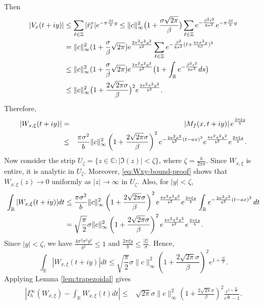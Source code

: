 \documentclass[11pt, reqno]{amsart}
\newcommand{\Z}{\mathbb{Z}}
\newcommand{\R}{\mathbb{R}}
\newcommand{\C}{\mathbb{C}}
\numberwithin{equation}{section}
\begin{document}
\begin{appendices}
Then 
\begin{align}\label{eq:Vx-bound-proof}
|V_x(t+iy)| &\le
\sum_{\ell\in\Z}|\breve r_\ell^x|e^{-\pi\frac{\beta\ell}{b}y} \le \|c\|_\infty^2\big(1+\frac{\sigma\sqrt{2\pi}}{\beta}\big)\sum_{\ell\in\Z}e^{-\frac{\beta^2\ell^2}{8\sigma^2}}
e^{-\pi\frac{\beta\ell}{b}y}\notag\\
	{}& = \|c\|_{\infty}^2 (1 + \frac{\sigma}{\beta} \sqrt{2 \pi}) e^{\frac{2 \pi^2 \sigma^2 y^2}{b^2}} \sum_{\ell \in \Z} e^{- \frac{\beta^2}{8 \sigma^2} (\ell + \frac{4 \pi \sigma^2 y}{b \beta})^2} \notag\\ %
		{}& \le \|c\|_{\infty}^2 (1 + \frac{\sigma}{\beta} \sqrt{2 \pi}) e^{\frac{2 \pi^2 \sigma^2 y^2}{b^2}} \big(1 + \int_{\R} e^{- \frac{\beta^2 s^2}{8 \sigma^2}} ds\big) \notag\\ 
		{}&\le \|c\|_{\infty}^2 \big(1 + \frac{2 \sqrt{2 \pi}\sigma}{\beta} \big)^2 e^{\frac{2 \pi^2 \sigma^2 y^2}{b^2}}.
\end{align}
Therefore,
\begin{eqnarray}\label{eq:Wxy-bound-proof}
|W_{x,\xi}(t+iy)| &=& |M_f(x,t+iy)|\,e^{\frac{2\pi \xi y}{b}}  \notag\\
&\le&
\frac{\pi\sigma^2}{b}\|c\|_\infty^2\left(1+\frac{2\sqrt{2\pi}\sigma}{\beta}\right)^2
e^{-\frac{2\pi^2\sigma^2}{b^2}(t-ax)^2}e^{\frac{4\pi^2\sigma^2 y^2}{b^2}}e^{\frac{2\pi\xi y}{b}}.
\end{eqnarray}
Now consider the strip $U_{\zeta} = \{z \in \C : |\Im(z)| < \zeta\}$, where $\zeta=\frac{b}{2\pi\sigma}$. 
Since \(W_{x,\xi}\) is entire, it is analytic in $U_\zeta$. Moreover, 
\eqref{eq:Wxy-bound-proof} shows that $W_{x,\xi}(z)\to 0$ uniformly as
$|z|\to\infty$ in $U_\zeta$. Also, for $|y|<\zeta$, 
\begin{align}\label{eq:Wxy-integ-bound-proof}
\int_{\R}|W_{x,\xi}(t+iy)|dt &\le \frac{\pi\sigma^2}{b} \|c\|_\infty^2\left(1+\frac{2\sqrt{2\pi}\sigma}{\beta}\right)^2 e^{\frac{4\pi^2\sigma^2 y^2}{b^2}} e^{\frac{2\pi\xi y}{b}}
\int_{\R}e^{-\frac{2\pi^2\sigma^2}{b^2}(t-ax)^2}\,dt \notag\\
&= \sqrt{\frac{\pi}{2}} \sigma \|c\|_\infty^2 \left(1+\frac{2\sqrt{2\pi}\sigma}{\beta}\right)^2
e^{\frac{4\pi^2\sigma^2 y^2}{b^2}}e^{\frac{2\pi\xi y}{b}}.
\end{align}
Since $|y|<\zeta$, we have
$ \frac{4\pi^2\sigma^2 y^2}{b^2}\le 1$ and  $\frac{2\pi\xi y}{b}\le \frac{|\xi|}{\sigma}$.
Hence, 
$$\int_{\R}|W_{x,\xi}(t+iy)|dt \le \sqrt{\frac{\pi}{2}} \sigma \|c\|_\infty^2 \left(1+\frac{2\sqrt{2\pi}\sigma}{\beta}\right)^2 e^{1+\frac{|\xi|}{\sigma}}.$$
Applying Lemma \ref{lem:trapezoidal} gives
\begin{align}\label{eq:disc-error-proof}
\left| I_h^\infty(W_{x,\xi})-\int_{\R}W_{x,\xi}(t) dt \right| \le {}&
\sqrt{2\pi}\sigma \|c\|_\infty^2\left(1+\frac{2\sqrt{2\pi}\sigma}{\beta}\right)^2
\frac{e^{1+\frac{|\xi|}{\sigma}}}{e^{\frac{b}{\sigma h}}-1}.
\end{align}


\end{appendices}
\end{document}
